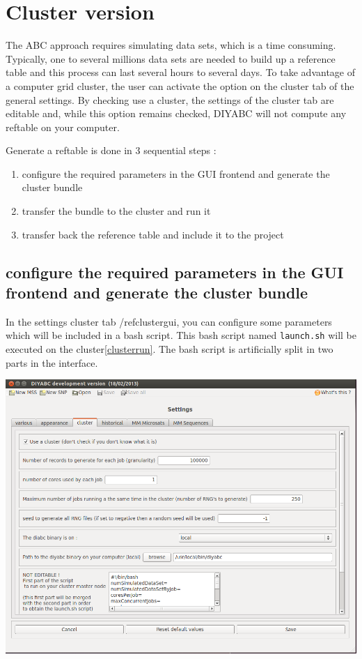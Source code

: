 \clearpage
\section{Cluster version}\label{cluster}
The ABC approach requires simulating data sets, which is a time consuming. Typically, one to several millions data sets are needed to build up a reference table and this process can last several hours to several days. To take advantage of a computer grid cluster, the user can activate the option on the cluster tab of the general settings. By checking \textsf{use a cluster}, the settings of the cluster tab are editable and, while this option remains checked, DIYABC will not compute any reftable on your computer. 

Generate a reftable is done in 3 sequential steps :
\begin{enumerate}
 \item configure the required parameters in the GUI frontend and generate the cluster bundle
 \item transfer the bundle to the cluster and run it
 \item transfer back the reference table and include it to the project
\end{enumerate}

\subsection{configure the required parameters in the GUI frontend and generate the cluster bundle}\label{clusterconfigure}
In the settings cluster tab /ref{clustergui}, you can configure some parameters which will be included in a bash script. This bash script named \texttt{launch.sh} will be executed on the cluster\ref{clusterrun}. The bash script is artificially split in two parts in the interface.

\includegraphics[scale=0.33]{gui_pictures/Capture-DIYABC-cluster.png} \\

